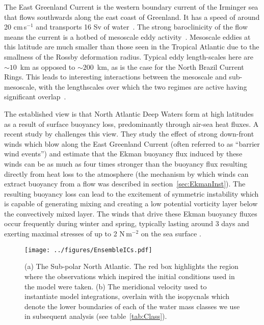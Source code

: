 The East Greenland Current is the western boundary current of the Irminger sea that flows southwards along the east coast of Greenland. It has a speed of around 20 cm\,s$^{-1}$ and transports 16 Sv of water~\citep{Talley2011ArcOce, Talley2011AtlOce}. The strong baroclinicity of the flow means the current is a hotbed of mesoscale eddy activity~\citep{Foldvik1988}. Mesoscale eddies at this latitude are much smaller than those seen in the Tropical Atlantic due to the smallness of the Rossby deformation radius. Typical eddy length-scales here are $\sim 10$~km as opposed to $\sim 200$~km, as is the case for the North Brazil Current Rings. This leads to interesting interactions between the mesoscale and sub-mesoscale, with the lengthscales over which the two regimes are active having significant overlap~\citep{Gula2022}.

The established view is that North Atlantic Deep Waters form at high latitudes as a result of surface buoyancy loss, predominantly through air-sea heat fluxes. A recent study by \citet{LeBras2022} challenges this view. They study the effect of strong down-front winds which blow along the East Greenland Current (often referred to as ``barrier wind events'') and estimate that the Ekman buoyancy flux induced by these winds can be as much as four times stronger than the buoyancy flux resulting directly from heat loss to the atmosphere (the mechanism by which winds can extract buoyancy from a flow was described in section~\ref{sec:EkmanInst}). The resulting buoyancy loss can lead to the excitement of symmetric instability which is capable of generating mixing and creating a low potential vorticity layer below the convectively mixed layer. The winds that drive these Ekman buoyancy fluxes occur frequently during winter and spring, typically lasting around 3 days and exerting maximal stresses of up to 2 N\,m$^{-2}$ on the sea surface \citep{LeBras2022}.

\begin{figure} 
    \centering
    \texttt{[image: ../figures/EnsembleICs.pdf]}
    \caption{(a) The Sub-polar North Atlantic. The red box highlights the region where the observations which inspired the initial conditions used in the model were taken. (b) The meridional velocity used to instantiate model integrations, overlain with the isopycnals which denote the lower boundaries of each of the water mass classes we use in subsequent analysis (see table~\ref{tab:Class}).}
    \label{fig:EnsembleICs}
\end{figure}

